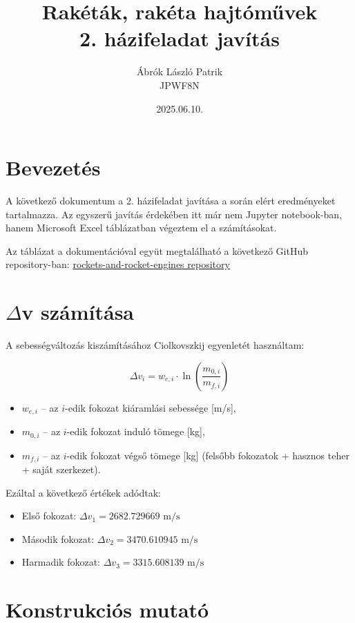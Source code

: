 \documentclass[a4paper,12pt]{article}
\title{Rakéták, rakéta hajtóművek\\ 2. házifeladat javítás}
\author{Ábrók László Patrik\\ JPWF8N}
\date{2025.06.10.} %
\begin{document}
\maketitle
\newpage



\section{Bevezetés}
A következő dokumentum a 2. házifeladat javítása a során elért eredményeket tartalmazza. Az egyszerű javítás érdekében itt már nem Jupyter notebook-ban, hanem Microsoft Excel táblázatban
végeztem el a számításokat.

Az táblázat a dokumentációval együt megtalálható a következő GitHub repository-ban:
\href{https://github.com/LaszloAbrok/rockets-and-rocket-engines}{rockets-and-rocket-engines repository}

\section{$\Delta$v számítása}

A sebességváltozás kiszámításához Ciolkovszkij egyenletét használtam:

\[
\Delta v_i = w_{e,i} \cdot \ln\left( \frac{m_{0,i}}{m_{f,i}} \right)
\]

\begin{itemize}
    \item \( w_{e,i} \) – az \(i\)-edik fokozat kiáramlási sebessége [m/s],
    \item \( m_{0,i} \) – az \(i\)-edik fokozat induló tömege [kg],
    \item \( m_{f,i} \) – az \(i\)-edik fokozat végső tömege [kg] (felsőbb fokozatok + hasznos teher + saját szerkezet).
  \end{itemize}

Ezáltal a következő értékek adódtak:
\begin{itemize}
    \item Első fokozat: \(\Delta v_1 = 2682.729669 \text{ m/s}\)
    \item Második fokozat: \(\Delta v_2 = 3470.610945 \text{ m/s}\)
    \item Harmadik fokozat: \(\Delta v_3 = 3315.608139 \text{ m/s}\)
\end{itemize}

\section{Konstrukciós mutató}
\end{document}
